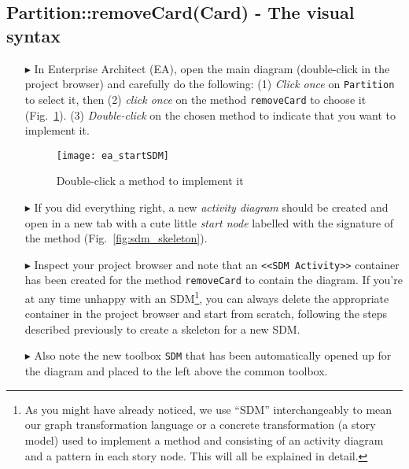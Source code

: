 \newpage
\hypertarget{remCard vis}{}
\subsection{Partition::removeCard(Card) - The visual syntax}
\visHeader

\begin{itemize}

\item[$\blacktriangleright$] In Enterprise Architect (EA), open the main diagram (double-click in the project browser) and carefully do the following: (1) \emph{Click once} on
\texttt{Partition} to select it, then (2) \emph{click once} on the method \texttt{removeCard} to choose it (Fig.~\ref{fig:sdm_start}). (3) \emph{Double-click}
on the chosen method to indicate that you want to implement it.

\begin{figure}[htp]
\begin{center}
  \texttt{[image: ea\_startSDM]}
  \caption{Double-click a method to implement it}  
  \label{fig:sdm_start}
\end{center}
\end{figure}
 
\item[$\blacktriangleright$] If you did everything right, a new \emph{activity diagram} should be created and open in a new tab with a cute little \emph{start node} 
labelled with the signature of the method (Fig.~\ref{fig:sdm_skeleton}).  

\item[$\blacktriangleright$] Inspect your project browser and note that an \texttt{<<SDM Activity>>} container has been created for the method
\texttt{removeCard} to contain the diagram. If you're at any time unhappy with an SDM\footnote{As you might have already noticed, we use ``SDM'' interchangeably
to mean our graph transformation language or a concrete transformation (a story model) used to implement a method and consisting of an activity diagram and a
pattern in each story node. This will all be explained in detail.}, you can always delete the appropriate container in the project browser and start from
scratch, following the steps described previously to create a skeleton for a new SDM. 

\item[$\blacktriangleright$] Also note the new toolbox \texttt{SDM} that has been automatically opened up for the diagram and placed to the left above the 
common toolbox.


\end{itemize}
